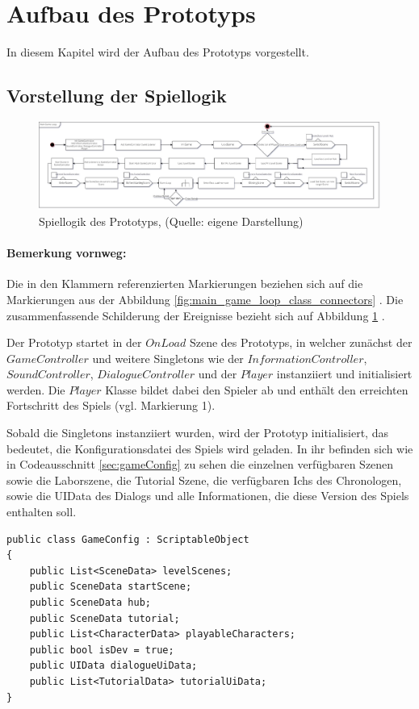 \section{Aufbau des Prototyps}\label{sec:rework}
In diesem Kapitel wird der Aufbau des Prototyps vorgestellt. 

\subsection{Vorstellung der Spiellogik}\label{sec:main-game-loop}
\begin{figure}[ht]
\centering
\includegraphics[width=1\linewidth]{content/pictures/Game-Loop_Prototype.jpg}
\caption{Spiellogik des Prototyps, (Quelle: eigene Darstellung)}
\label{fig:main_game_loop}
\end{figure}

\paragraph{Bemerkung vornweg:}
Die in den Klammern referenzierten Markierungen beziehen sich auf die Markierungen aus der Abbildung \ref{fig:main_game_loop_class_connectors} . Die zusammenfassende Schilderung der Ereignisse bezieht sich auf Abbildung \ref{fig:main_game_loop} .


Der Prototyp startet in der $OnLoad$ Szene des Prototyps, in welcher zunächst der $GameController$ und weitere Singletons wie der $InformationController$,\\ $SoundController$, $DialogueController$ und der $Player$ instanziiert und initialisiert werden. Die $Player$ Klasse bildet dabei den Spieler ab und enthält den erreichten Fortschritt des Spiels (vgl. Markierung 1).

Sobald die Singletons instanziiert wurden, wird der Prototyp initialisiert, das bedeutet, die Konfigurationsdatei des Spiels wird geladen. In ihr befinden sich wie in Codeausschnitt \ref{sec:gameConfig} zu sehen die einzelnen verfügbaren Szenen sowie die Laborszene, die Tutorial Szene, die verfügbaren Ichs des Chronologen, sowie die UIData des Dialogs und alle Informationen, die diese Version des Spiels enthalten soll.
\begin{lstlisting}[caption={GameConfig des Prototyps}, label={sec:gameConfig}]
public class GameConfig : ScriptableObject
{
    public List<SceneData> levelScenes;
    public SceneData startScene;
    public SceneData hub;
    public SceneData tutorial;
    public List<CharacterData> playableCharacters;
    public bool isDev = true;
    public UIData dialogueUiData;
    public List<TutorialData> tutorialUiData;
}
\end{lstlisting}

